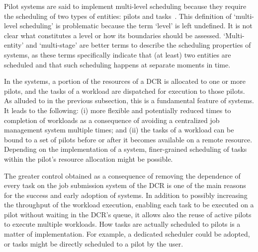 \documentclass{sig-alternate}
\begin{document}
Pilot systems are said to implement multi-level scheduling because they require
the scheduling of two types of entities: pilots and
tasks~\cite{rubio2015gwpilot,de2014panda,balderrama2012scalable}. This
definition of `multi-level scheduling' is problematic because the term `level'
is left undefined. It is not clear what constitutes a level or how its
boundaries should be assessed. `Multi-entity' and `multi-stage' are better terms
to describe the scheduling properties of \pilot systems, as these terms
specifically indicate that (at least) two entities are scheduled and that such
scheduling happens at separate moments in time.

In the \pilot systems, a portion of the resources of a DCR is allocated to one
or more pilots, and the tasks of a workload are dispatched for execution to
those pilots. As alluded to in the previous subsection, this is a fundamental
feature of \pilot systems. It leads to the following: (i) more flexible and
potentially reduced times to completion of workloads as a consequence of
avoiding a centralized job management system multiple times; and (ii) the tasks
of a workload can be bound to a set of pilots before or after it becomes
available on a remote resource. Depending on the implementation of a \pilot
system, finer-grained scheduling of tasks within the pilot's resource allocation
might be possible.





The greater control obtained as a consequence of removing the dependence of
every task on the job submission system of the DCR is one of the main reasons
for the success and early adoption of \pilot systems. In addition to possibly
increasing the throughput of the workload execution, enabling each task to be
executed on a pilot without waiting in the DCR's queue, it allows also the reuse
of active pilots to execute multiple workloads. How tasks are actually scheduled
to pilots is a matter of implementation. For example, a dedicated scheduler
could be adopted, or tasks might be directly scheduled to a pilot by the user.
\end{document}
